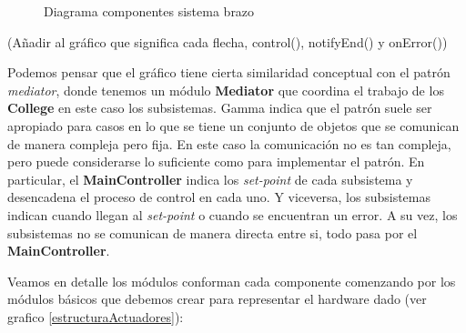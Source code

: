 \begin{figure}[h]
\caption{Diagrama componentes sistema brazo}
\begin{center}
\end{center}
\end{figure}
(Añadir al gráfico que significa cada flecha, control(), notifyEnd() y onError())

Podemos pensar que el gráfico tiene cierta similaridad conceptual con el patrón \textit{mediator}, donde tenemos un módulo \textbf{Mediator} que coordina el trabajo de los \textbf{College} en este caso los subsistemas. Gamma indica que el patrón suele ser apropiado para casos en lo que se tiene un conjunto de objetos que se comunican de manera compleja pero fija. En este caso la comunicación no es tan compleja, pero puede considerarse lo suficiente como para implementar el patrón. En particular, el \textbf{MainController} indica los \textit{set-point} de cada subsistema y desencadena el proceso de control en cada uno. Y viceversa, los subsistemas indican cuando llegan al \textit{set-point} o cuando se encuentran un error. A su vez, los subsistemas no se comunican de manera directa entre si, todo pasa por el \textbf{MainController}.

Veamos en detalle los módulos conforman cada componente comenzando por los módulos básicos que debemos crear para representar el hardware dado (ver grafico \ref{estructuraActuadores}):

